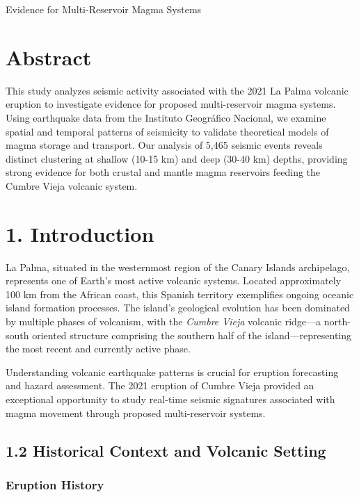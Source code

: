 \documentclass[
  letterpaper,
]{book}
\begin{document}
Evidence for Multi-Reservoir Magma Systems

\hfill\break

\label{abstract}

\chapter{Abstract}\label{abstract}

This study analyzes seismic activity associated with the 2021 La Palma
volcanic eruption to investigate evidence for proposed multi-reservoir
magma systems. Using earthquake data from the Instituto Geográfico
Nacional, we examine spatial and temporal patterns of seismicity to
validate theoretical models of magma storage and transport. Our analysis
of 5,465 seismic events reveals distinct clustering at shallow (10-15
km) and deep (30-40 km) depths, providing strong evidence for both
crustal and mantle magma reservoirs feeding the Cumbre Vieja volcanic
system.


\chapter{1. Introduction}\label{introduction}

La Palma, situated in the westernmost region of the Canary Islands
archipelago, represents one of Earth's most active volcanic systems.
Located approximately 100 km from the African coast, this Spanish
territory exemplifies ongoing oceanic island formation processes. The
island's geological evolution has been dominated by multiple phases of
volcanism, with the \emph{Cumbre Vieja} volcanic ridge---a north-south
oriented structure comprising the southern half of the
island---representing the most recent and currently active phase.

Understanding volcanic earthquake patterns is crucial for eruption
forecasting and hazard assessment. The 2021 eruption of Cumbre Vieja
provided an exceptional opportunity to study real-time seismic
signatures associated with magma movement through proposed
multi-reservoir systems.

\section{1.2 Historical Context and Volcanic
Setting}\label{historical-context-and-volcanic-setting}

\subsection{Eruption History}\label{eruption-history}
\end{document}
